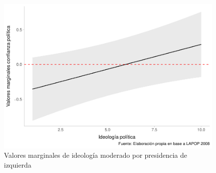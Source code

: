 \documentclass[
  12pt,
  a4paper,
]{article}
\begin{document}
\begin{figure}

{\centering \includegraphics{01-guia_files/figure-latex/fig3-1} 

}

\caption{Valores marginales de ideología moderado por presidencia de izquierda}\label{fig:fig3}
\end{figure}

\pagebreak
\end{document}
